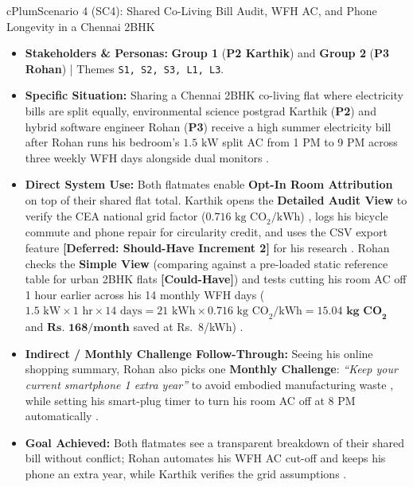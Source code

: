 \documentclass[12pt, a4paper]{article}
\begin{document}
\begin{scenariocard}{cPlum}{Scenario 4 (SC4): Shared Co-Living Bill Audit, WFH AC, and Phone Longevity in a Chennai 2BHK}
\footnotesize
\begin{itemize}
    \item \textbf{Stakeholders \& Personas:} \textbf{Group 1} (\textbf{P2 Karthik}) and \textbf{Group 2} (\textbf{P3 Rohan}) | Themes \texttt{S1, S2, S3, L1, L3}.
    \item \textbf{Specific Situation:} Sharing a Chennai 2BHK co-living flat where electricity bills are split equally, environmental science postgrad Karthik (\textbf{P2}) and hybrid software engineer Rohan (\textbf{P3}) receive a high summer electricity bill after Rohan runs his bedroom's $1.5\text{ kW}$ split AC from 1 PM to 9 PM across three weekly WFH days alongside dual monitors \cite{cf2, cf4, cf10}.
    \item \textbf{Direct System Use:} Both flatmates enable \textbf{Opt-In Room Attribution} on top of their shared flat total. Karthik opens the \textbf{Detailed Audit View} to verify the CEA national grid factor ($0.716\text{ kg CO}_2/\text{kWh}$) \cite{cea2023, cf4}, logs his bicycle commute and phone repair for circularity credit, and uses the CSV export feature \textbf{[Deferred: Should-Have Increment 2]} for his research \cite{cf4}. Rohan checks the \textbf{Simple View} (comparing against a pre-loaded static reference table for urban 2BHK flats \textbf{[Could-Have]}) and tests cutting his room AC off 1 hour earlier across his 14 monthly WFH days ($1.5\text{ kW} \times 1\text{ hr} \times 14\text{ days} = 21\text{ kWh} \times 0.716\text{ kg CO}_2/\text{kWh} = \mathbf{15.04\text{ kg CO}_2}$ and $\mathbf{\text{Rs.\ } 168/\text{month}}$ saved at Rs.\ 8/kWh) \cite{cea2023, cf2}.
    \item \textbf{Indirect / Monthly Challenge Follow-Through:} Seeing his online shopping summary, Rohan also picks one \textbf{Monthly Challenge}: \textit{``Keep your current smartphone 1 extra year''} to avoid embodied manufacturing waste \cite{shi2021, cf10}, while setting his smart-plug timer to turn his room AC off at 8 PM automatically \cite{cf2}.
    \item \textbf{Goal Achieved:} Both flatmates see a transparent breakdown of their shared bill without conflict; Rohan automates his WFH AC cut-off and keeps his phone an extra year, while Karthik verifies the grid assumptions \cite{cf2, cf4, cf10}.
\end{itemize}
\end{scenariocard}
\end{document}
